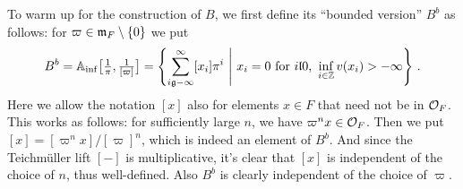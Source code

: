 \documentclass[a4paper, 10pt, oneside, DIV=9, chapterprefix=true, numbers=enddot,bibliography=totoc]{scrbook}
\begin{document}
To warm up for the construction of $B$, we first define its \enquote{bounded version} $B^b$ as follows: for $\varpi\in\mathfrak{m}_F\setminus\{0\}$ we put
\begin{equation*}
	B^b=\IA_\inf\big[\textstyle\frac{1}{\pi},\frac{1}{[\varpi]}\big]\displaystyle=\left\{\sum_{i\gge -\infty}^\infty [x_i]\pi^i\st x_i=0\text{ for }i\lle 0\text{, }\inff_{i\in\IZ}v(x_i)>-\infty\right\}\,.
\end{equation*}
Here we allow the notation $[x]$ also for elements $x\in F$ that need not be in $\mathcal{O}_F$. This works as follows: for sufficiently large $n$, we have $\varpi^nx\in\mathcal{O}_F$. Then we put $[x]=[\varpi^nx]/[\varpi]^n$, which is indeed an element of $B^b$. And since the Teichmüller lift $[-]$ is multiplicative, it's clear that $[x]$ is independent of the choice of $n$, thus well-defined. Also $B^b$ is clearly independent of the choice of $\varpi$.
\end{document}

